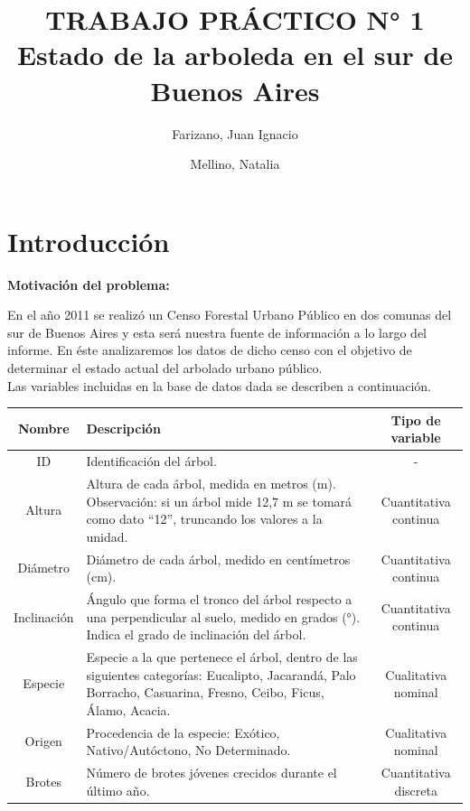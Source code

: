 \documentclass[11pt]{article}
\title{
  TRABAJO PRÁCTICO N° 1\\
  \large Estado de la arboleda en el sur de Buenos Aires
}
\author{
  Farizano, Juan Ignacio \\
  \and
  Mellino, Natalia
}
\date{}
\begin{document}
\maketitle
\newpage

\tableofcontents
\newpage


\section{Introducción}
\textbf{Motivación del problema:}

\begin{justify}
  En el año 2011 se realizó un Censo Forestal Urbano Público en dos
  comunas del sur de Buenos Aires y esta será nuestra fuente de información
  a lo largo del informe.
  En éste analizaremos los datos de dicho censo con el objetivo
  de determinar el estado actual del arbolado urbano público.\\
  Las variables incluidas en la base de datos dada se describen a continuación.
\end{justify}

\begin{center}
  \begin{tabular}{| c | p{9cm} | c |}
    \hline
    \textbf{Nombre} & \textbf{Descripción} & \textbf{Tipo de variable} \\ \hline
    ID & Identificación del árbol. & - \\ \hline
    Altura & Altura de cada árbol, medida en metros (m). Observación: si un árbol
    mide 12,7 m se tomará como dato “12”, truncando los valores a la unidad. & 
    Cuantitativa continua \\ \hline
    Diámetro & Diámetro de cada árbol, medido en centímetros (cm). & 
    Cuantitativa continua \\ \hline
    Inclinación & Ángulo que forma el tronco del árbol respecto
    a una perpendicular al suelo, medido en grados (°).
    Indica el grado de inclinación del árbol. & Cuantitativa continua \\ \hline
    Especie & Especie a la que pertenece el árbol, dentro de las siguientes
    categorías: Eucalipto, Jacarandá, Palo Borracho, Casuarina, Fresno, Ceibo,
    Ficus, Álamo, Acacia. & Cualitativa nominal \\ \hline
    Origen & Procedencia de la especie: Exótico, Nativo/Autóctono, 
    No Determinado. & Cualitativa nominal \\ \hline
    Brotes & Número de brotes jóvenes crecidos durante el último año. &
    Cuantitativa discreta \\ \hline
  \end{tabular}
\end{center}
\end{document}
